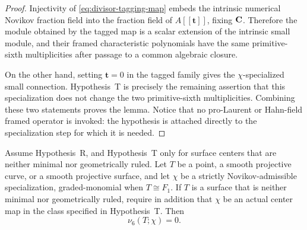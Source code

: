 \begin{proof}
Injectivity of
\eqref{eq:divisor-tagging-map} embeds the intrinsic numerical Novikov
fraction field into the fraction field of $A[[\boldsymbol t]]$, fixing
$\mathbf C$.  Therefore the module obtained by the tagged map is a scalar extension
of the intrinsic small module, and their framed characteristic polynomials
have the same primitive-sixth multiplicities after passage to a common
algebraic closure.

On the other hand, setting $\boldsymbol t=0$ in the tagged family gives the
$\chi$-specialized small connection.  Hypothesis~T is precisely the
remaining assertion that this specialization does not change the two
primitive-sixth multiplicities.  Combining these two statements proves the
lemma.  Notice that no pro-Laurent or Hahn-field framed operator is invoked:
the hypothesis is attached directly to the specialization step for which it
is needed.
\end{proof}

\begin{proposition}
\label{prop:low-dimensional-vanishing}
%
%
Assume Hypothesis~R, and Hypothesis~T only for surface centers that are
neither minimal nor geometrically ruled.  Let \(T\) be a point, a smooth
projective curve, or a smooth projective
surface, and let \(\chi\) be a strictly Novikov-admissible specialization,
graded-monomial when \(T\cong F_1\). If \(T\) is a surface that is neither
minimal nor geometrically ruled, require in addition that \(\chi\) be an
actual center map in the class specified in Hypothesis~T. Then
\begin{equation}
 \nu_6(T;\chi)=0.
 \label{eq:low-dimensional-vanishing}
\end{equation}
\end{proposition}

